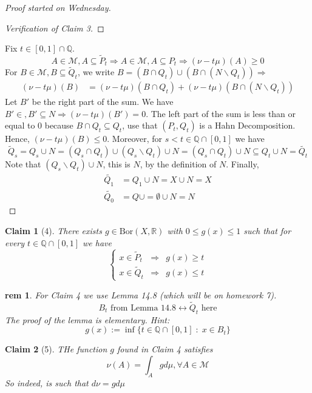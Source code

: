 \documentclass[letterpaper, 12pt]{article}
\newcommand{\st}{\; : \; }
\newcommand{\fin}{\qquad \quad \hfill \framebox[1.75mm][l]{\,}}
\newcommand{\cM}{\mathcal{M}}
\newcommand{\bR}{\mathbb{R}}
\newcommand{\bQ}{\mathbb{Q}}
\newcommand{\Bor}{\mathrm{Bor}}
\theoremstyle{stdthm}
\theoremstyle{stddef}
\newtheorem{rem}[thm]{rem} %
\theoremstyle{stdnonum}
\newtheorem{claim}{Claim}
\theoremstyle{stdqands}
\theoremstyle{stdbold}
\begin{document}
\begin{proof}[Proof started on Wednesday]
\begin{proof}[Verification of Claim 3]
\end{proof}
\noindent Fix $t \in [0,1] \cap \bQ$. 
\[A \in \cM, A\subseteq \tilde{P}_t \Rightarrow A \in \cM , A\subseteq P_t \Rightarrow  (\nu - t\mu)(A) \geq 0 \]
For $B \in \cM, B \subseteq \tilde{Q}_t$, we write $B = (B \cap Q_t) \cup (B \cap (N \backslash Q_t)) \Rightarrow  $
\begin{align*}
(\nu - t\mu) (B) &= (\nu - t\mu) (B \cap Q_t) + (\nu - t\mu) (B \cap (N \backslash Q_t))
\end{align*}
Let $B'$ be the right part of the sum. We have $B' \in, B' \subseteq N \Rightarrow (\nu - t\mu)(B') = 0$. The left part of the sum is less than or equal to 0 because $B \cap Q_t \subseteq Q_t$, use that $(P_t,Q_t)$ is a Hahn Decomposition.  Hence, $(\nu - t\mu) (B) \leq 0$. Moreover, for $s < t\in \bQ \cap [0,1]$ we have 
\[\tilde{Q}_s = Q_s \cup N = (Q_s \cap Q_t) \cup (Q_s \backslash Q_t) \cup N = (Q_s \cap Q_t) \cup N \subseteq Q_t \cup N = \tilde{Q_t} \]
Note that $(Q_s \backslash Q_t) \cup N$, this is $N$, by the definition of $N$. Finally, 
\begin{align*}
\tilde{Q_1} &= Q_1 \cup N = X \cup N = X \\
\tilde{Q_0} &= Q \cup = \emptyset \cup N = N
\end{align*}
\end{proof}

\begin{claim}[4]
There exists $g\in\Bor(X,\bR)$ with $0\leq g(x)\leq 1$ such that for every $t\in\bQ\cap[0,1]$ we have
\[
\left\{
\begin{array}{ccc}
x\in\tilde{P}_t & \Longrightarrow & g(x)\geq t\\
x\in\tilde{Q}_t & \Longrightarrow & g(x)\leq t
\end{array}
\right.
\]
\end{claim}

\begin{rem}
For Claim 4 we use Lemma 14.8 (which will be on homework 7).
\[
B_t \mbox{ from Lemma 14.8} \longleftrightarrow \tilde{Q}_t \mbox{ here}
\]
The proof of the lemma is elementary. Hint:
\[
g(x):= \inf\{t\in\bQ\cap[0,1] \st x\in B_t\}
\]
\end{rem}

\begin{claim}[5]
THe function $g$ found in Claim 4 satisfies 
\[ \tag{$*$}  \nu(A) = \int_A g d\mu, \forall A \in \cM \]
So indeed, is such that $d\nu = gd\mu$
\end{claim}
\end{document}
